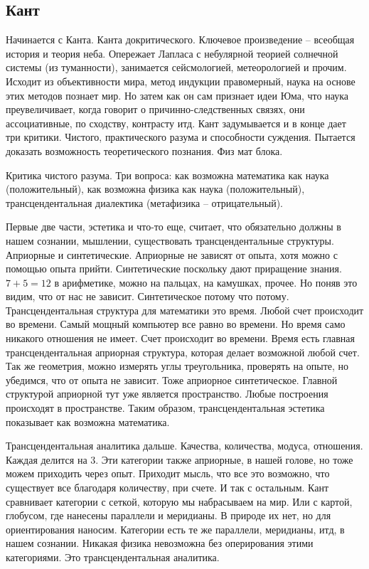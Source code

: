\documentclass[a4paper, 12pt]{article}
\begin{document}
\subsection{Кант}
Начинается с Канта. Канта докритического. Ключевое произведение -- 
всеобщая история и теория неба. Опережает Лапласа с небулярной теорией 
солнечной системы (из туманности), занимается сейсмологией, 
метеорологией и прочим. Исходит из объективности мира, метод индукции 
правомерный, наука на основе этих методов познает мир. Но затем как он 
сам признает идеи Юма, что наука преувеличивает, когда говорит 
о причинно-следственных связях, они ассоциативные, по сходству, 
контрасту итд. Кант задумывается и в конце дает три критики. Чистого, 
практического разума и способности суждения. Пытается доказать 
возможность теоретического познания. Физ мат блока.

Критика чистого разума. Три вопроса: как возможна математика как наука 
(положительный), как возможна физика как наука (положительный), 
трансцендентальная диалектика (метафизика -- отрицательный).

Первые две части, эстетика и что-то еще, считает, что обязательно должны 
в нашем сознании, мышлении, существовать трансцендентальные структуры. 
Априорные и синтетические. Априорные не зависят от опыта, хотя можно 
с помощью опыта прийти. Синтетические поскольку дают приращение знания. 
$7+5=12$ в арифметике, можно на пальцах, на камушках, прочее. Но поняв 
это видим, что от нас не зависит. Синтетическое потому что потому. 
Трансцендентальная структура для математики это время. Любой счет 
происходит во времени. Самый мощный компьютер все равно во времени. Но 
время само никакого отношения не имеет. Счет происходит во времени. 
Время есть главная трансцендентальная априорная структура, которая 
делает возможной любой счет. Так же геометрия, можно измерять углы 
треугольника, проверять на опыте, но убедимся, что от опыта не зависит. 
Тоже априорное синтетическое. Главной структурой априорной тут уже 
является пространство. Любые построения происходят в пространстве. Таким 
образом, трансцендентальная эстетика показывает как возможна математика.

Трансцендентальная аналитика дальше. Качества, количества, модуса, 
отношения. Каждая делится на 3. Эти категории также априорные, в нашей 
голове, но тоже можем приходить через опыт. Приходит мысль, что все это 
возможно, что существует все благодаря количеству, при счете. И так 
с остальным. Кант сравнивает категории с сеткой, которую мы набрасываем 
на мир. Или с картой, глобусом, где нанесены параллели и меридианы. 
В природе их нет, но для ориентирования наносим. Категории есть те же 
параллели, меридианы, итд, в нашем сознании. Никакая физика невозможна 
без оперирования этими категориями. Это трансцендентальная аналитика.
\end{document}
